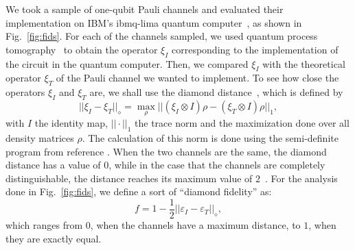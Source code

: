 \documentclass[10pt,letterpaper]{article} %
\newcommand{\fref}[1]{Fig.~\ref{#1}}
\begin{document}

We took a sample of one-qubit Pauli channels
and evaluated their implementation on IBM's
ibmq-lima quantum computer~\cite{Qiskit},
as shown in \fref{fig:fids}. 
For each of the channels sampled, we used 
quantum process tomography~\cite{Qiskit, Chuang:1996} to obtain the 
operator $\xi_I$ corresponding to the implementation of the
circuit in the quantum computer. 
Then, we compared $\xi_I$ with the theoretical 
operator $\xi_T$ of the Pauli channel we wanted to implement.
To see how close the operators $\xi_I$ and 
$\xi_T$ are, we shall use the
diamond distance~\cite{Aharonov,Wilde}, which is defined by
\begin{equation}
||\xi_I - \xi_T ||_{\diamond}  = \max_{\rho} || (\xi_I \otimes I) \rho - (\xi_T \otimes I) \rho ||_1,
\end{equation}
with $I$ the identity map,
$|| \cdot ||_1$ the trace norm and the maximization
done over all density matrices $\rho$.
The calculation of this norm is done using the semi-definite program from reference \cite{Watrous}.
When the two channels are the same,
the diamond distance has a value of $0$, while in the case that the channels
are completely distinguishable, the distance reaches its maximum value of $2$~\cite{Benenti}.
For the analysis done in \fref{fig:fids}, we define a sort of ``diamond fidelity'' as: 
\begin{equation}
f = 1 - \dfrac{1}{2} ||\varepsilon_I - \varepsilon_T ||_{\diamond},
\label{eq:diamond-fid}
\end{equation}
which ranges from $0$, when the channels have a maximum distance, to  $1$,
when they are exactly equal.
\end{document}
